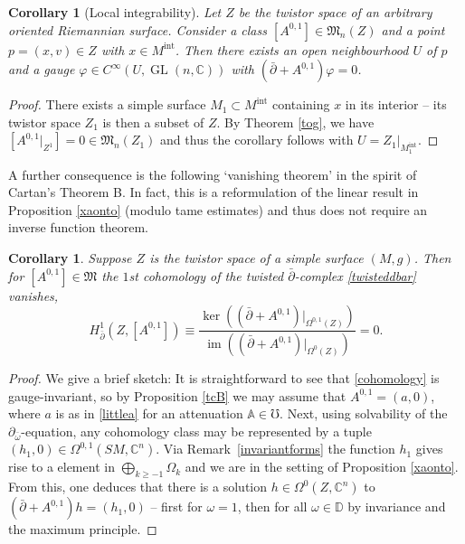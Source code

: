 \documentclass[JEP,XML,SOM,Unicode,published]{cedram}
\DeclareMathOperator{\GL}{GL}
\theoremstyle{plain}
\newtheorem{corollary}[theorem]{Corollary}
\theoremstyle{definition}
\newcommand{\A}{\mathbb{A}}
\newcommand{\C}{\mathbb{C}}
\newcommand{\DD}{\mathbb{D}}
\newcommand{\M}{\mathfrak{M}}
\newcommand{\interior}{\mathrm{int}}
\newcommand{\1}{{\bf 1}}
\begin{document}
\begin{corollary}[Local integrability]\label{localint} Let $Z$ be the twistor space of an arbitrary oriented Riemannian surface. Consider a class $[A^{0,1}]\in \M_n(Z)$ and a point $p=(x,v)\in Z$ with $x\in M^\interior$. Then there exists an open neighbourhood $U$ of $p$ and a gauge $\varphi\in C^\infty(U,\GL(n,\C))$ with $(\bar \partial + A^{0,1})\varphi=0$.
\end{corollary}

\begin{proof}
There exists a simple surface $M_1\subset M^{\interior}$ containing $x$ in its interior -- its twistor space $Z_1$ is then a subset of $Z$. By Theorem \ref{tog}, we have $[A^{0,1}\vert_{Z^1}]=0\in \M_n(Z_1)$ and thus the corollary follows with $U=Z_1\vert_{M_1^\interior}$.
\end{proof}

A further consequence is the following `vanishing theorem' in the spirit of Cartan's Theorem B. In fact, this is a reformulation of the linear result in Proposition \ref{xaonto} (modulo tame estimates) and thus does not require an inverse function theorem.

\begin{corollary}\label{corco} Suppose $Z$ is the twistor space of a simple surface $(M,g)$. Then for $[A^{0,1}]\in \M$ the $1$st cohomology of the twisted $\bar \partial$-complex \eqref{twisteddbar} vanishes, \ie
\begin{equation}\label{cohomology}
H^1_{\bar \partial}(Z,[A^{0,1}])\equiv\frac{\ker \left((\bar \partial + A^{0,1})\vert_{\Omega^{0,1}(Z)}\right)}{ \operatorname{im} \left((\bar \partial + A^{0,1})\vert_{\Omega^0(Z)}\right)} = 0.
\end{equation}
\end{corollary}

\begin{proof} We give a brief sketch: It is straightforward to see that \eqref{cohomology} is gauge-invariant, so by Proposition \ref{tcB} we may assume that $A^{0,1}=(a,0)$, where $a$ is as in \eqref{littlea} for an attenuation $\A \in \mho$. Next, using solvability of the $\partial_{\bar \omega}$-equation, any cohomology class may be represented by a tuple $(h_1,0)\in \Omega^{0,1}(SM,\C^n)$. Via Remark~\ref{invariantforms} the function $h_1$ gives rise to a element in $\bigoplus_{k\ge -1}\Omega_k$ and we are in the setting of Proposition \ref{xaonto}. From this, one deduces that there is a solution $h\in \Omega^0(Z,\C^n)$ to $(\bar \partial + A^{0,1})h=(h_1,0)$ -- first for $\omega=1$, then for all $\omega \in \DD$ by invariance and the maximum principle.
\end{proof}
\end{document}
